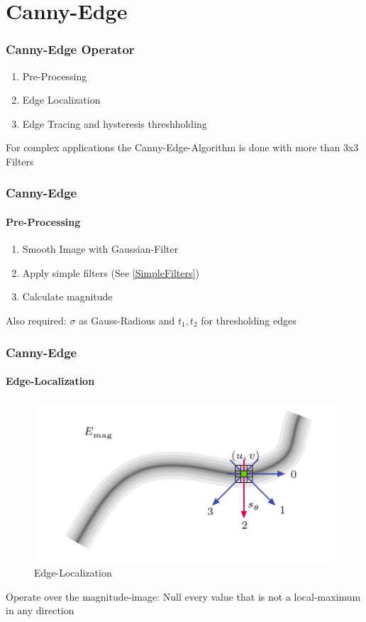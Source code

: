 
\section{Canny-Edge}
\begin{frame}
	\frametitle{Canny-Edge Operator}
	\begin{enumerate}
		\item Pre-Processing
		\item Edge Localization
		\item Edge Tracing and hysteresis threshholding
	\end{enumerate}
	For complex applications the Canny-Edge-Algorithm is done with more than 3x3 Filters
\end{frame}

\begin{frame}
	\frametitle{Canny-Edge}
	\framesubtitle{Pre-Processing}
	\begin{enumerate}
		\item Smooth Image with Gaussian-Filter
		\item Apply simple filters (See \ref{SimpleFilters})
		\item Calculate magnitude
	\end{enumerate}
	Also required: $\sigma$ as Gauss-Radious and $t_1,t_2$ for thresholding edges
\end{frame}

\begin{frame}
	\frametitle{Canny-Edge}
	\framesubtitle{Edge-Localization}
	\begin{figure}
		\centering
		\includegraphics[width=0.6\linewidth]{images/CannyEdgeLocalization}
		\caption[Edge-Localization]{Edge-Localization}
		\label{fig:cannyedgelocalization}
	\end{figure}
	Operate over the magnitude-image:\newline
	Null every value that is not a local-maximum in any direction 
\end{frame}

